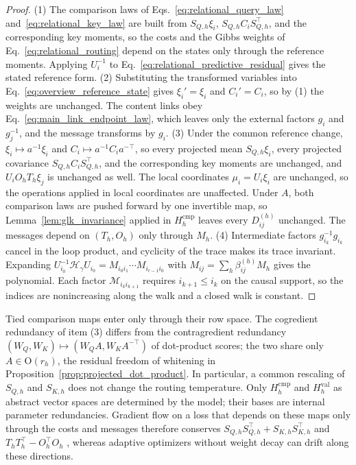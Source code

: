 \documentclass[twoside,11pt]{article}
\begin{document}
\begin{proof}
(1) The comparison laws of Eqs.~\eqref{eq:relational_query_law} and~\eqref{eq:relational_key_law} are built from $S_{Q,h}\xi_i$, $S_{Q,h}C_iS_{Q,h}^\top$, and the corresponding key moments, so the costs and the Gibbs weights of Eq.~\eqref{eq:relational_routing} depend on the states only through the reference moments. Applying $U_i^{-1}$ to Eq.~\eqref{eq:relational_predictive_residual} gives the stated reference form.
(2) Substituting the transformed variables into Eq.~\eqref{eq:overview_reference_state} gives $\xi_i'=\xi_i$ and $C_i'=C_i$, so by (1) the weights are unchanged. The content links obey Eq.~\eqref{eq:main_link_endpoint_law}, which leaves only the external factors $g_i$ and $g_j^{-1}$, and the message transforms by $g_i$.
(3) Under the common reference change, $\xi_i\mapsto a^{-1}\xi_i$ and $C_i\mapsto a^{-1}C_ia^{-\top}$, so every projected mean $S_{Q,h}\xi_i$, every projected covariance $S_{Q,h}C_iS_{Q,h}^\top$, and the corresponding key moments are unchanged, and $U_iO_hT_h\xi_j$ is unchanged as well. The local coordinates $\mu_i=U_i\xi_i$ are unchanged, so the operations applied in local coordinates are unaffected. Under $A$, both comparison laws are pushed forward by one invertible map, so Lemma~\ref{lem:glk_invariance} applied in $H_h^{\mathrm{cmp}}$ leaves every $D_{ij}^{(h)}$ unchanged. The messages depend on $(T_h,O_h)$ only through $M_h$.
(4) Intermediate factors $g_{i_k}^{-1}g_{i_k}$ cancel in the loop product, and cyclicity of the trace makes its trace invariant. Expanding $U_{i_0}^{-1}\mathcal H_\gamma U_{i_0}=M_{i_0i_1}\cdots M_{i_{r-1}i_0}$ with $M_{ij}=\sum_h\beta_{ij}^{(h)}M_h$ gives the polynomial. Each factor $\mathcal M_{i_ki_{k+1}}$ requires $i_{k+1}\le i_k$ on the causal support, so the indices are nonincreasing along the walk and a closed walk is constant.
\end{proof}

Tied comparison maps enter only through their row space. The cogredient redundancy of item (3) differs from the contragredient redundancy $(W_Q,W_K)\mapsto(W_QA,W_KA^{-\top})$ of dot-product scores; the two share only $A\in\mathrm O(r_h)$, the residual freedom of whitening in Proposition~\ref{prop:projected_dot_product}. In particular, a common rescaling of $S_{Q,h}$ and $S_{K,h}$ does not change the routing temperature. Only $H_h^{\mathrm{cmp}}$ and $H_h^{\mathrm{val}}$ as abstract vector spaces are determined by the model; their bases are internal parameter redundancies. Gradient flow on a loss that depends on these maps only through the costs and messages therefore conserves $S_{Q,h}S_{Q,h}^\top+S_{K,h}S_{K,h}^\top$ and $T_hT_h^\top-O_h^\top O_h$ \citep{du2018balanced,Kunin2021NeuralMechanics}, whereas adaptive optimizers without weight decay can drift along these directions.
\end{document}

